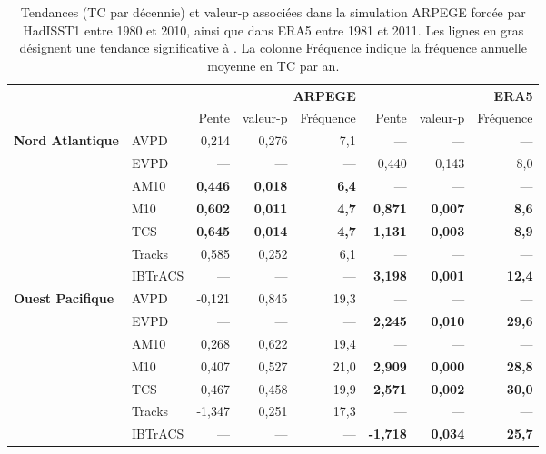 \documentclass[../main.tex]{subfiles}
\begin{document}
\begin{table}[htpb]
    \centering
    \caption{ Tendances (TC par décennie) et valeur-p associées dans la simulation ARPEGE forcée par HadISST1 entre 1980 et 2010, ainsi que dans ERA5 entre 1981
    et 2011. Les lignes en gras désignent une tendance significative à . La colonne Fréquence indique la fréquence annuelle moyenne en TC par an.}
    \label{tab:tendances_PRE625REFT359x}
    \begin{adjustbox}{height=0.45\textheight}
        \begin{tabular}{llrrr|rrr}
        \toprule
         &  & \multicolumn{3}{r}{\textbf{ARPEGE}} & \multicolumn{3}{r}{\textbf{ERA5}} \\
         &  & Pente & valeur-p & Fréquence & Pente & valeur-p & Fréquence \\
        \cline{1-8}
        \multirow[t]{7}{*}{\textbf{Nord Atlantique}} & AVPD & 0,214 & 0,276 & 7,1 & --- & --- & --- \\
         & EVPD & --- & --- & --- & 0,440 & 0,143 & 8,0 \\
         & AM10 & \textbf{0,446} & \textbf{0,018} & \textbf{6,4} & --- & --- & --- \\
         & M10 & \textbf{0,602} & \textbf{0,011} & \textbf{4,7} & \textbf{0,871} & \textbf{0,007} & \textbf{8,6} \\
         & TCS & \textbf{0,645} & \textbf{0,014} & \textbf{4,7} & \textbf{1,131} & \textbf{0,003} & \textbf{8,9} \\
         & Tracks & 0,585 & 0,252 & 6,1 & --- & --- & --- \\
         & IBTrACS & --- & --- & --- & \textbf{3,198} & \textbf{0,001} & \textbf{12,4} \\
        \cline{1-8}
        \multirow[t]{7}{*}{\textbf{Ouest Pacifique}} & AVPD & -0,121 & 0,845 & 19,3 & --- & --- & --- \\
         & EVPD & --- & --- & --- & \textbf{2,245} & \textbf{0,010} & \textbf{29,6} \\
         & AM10 & 0,268 & 0,622 & 19,4 & --- & --- & --- \\
         & M10 & 0,407 & 0,527 & 21,0 & \textbf{2,909} & \textbf{0,000} & \textbf{28,8} \\
         & TCS & 0,467 & 0,458 & 19,9 & \textbf{2,571} & \textbf{0,002} & \textbf{30,0} \\
         & Tracks & -1,347 & 0,251 & 17,3 & --- & --- & --- \\
         & IBTrACS & --- & --- & --- & \textbf{-1,718} & \textbf{0,034} & \textbf{25,7} \\

\end{tabular}
\end{adjustbox}
\end{table}
\end{document}
